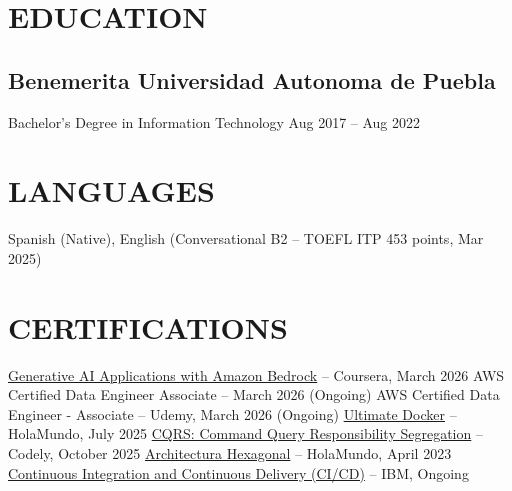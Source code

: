 \documentclass[a4paper,10pt]{article}
\begin{document}
\section*{EDUCATION}

\subsection*{\small Benemerita Universidad Autonoma de Puebla}
Bachelor's Degree in Information Technology \hfill Aug 2017 -- Aug 2022

\section*{LANGUAGES}
Spanish (Native), English (Conversational B2 -- TOEFL ITP 453 points, Mar 2025)

\section*{CERTIFICATIONS}
    \href{https://coursera.org/verify/HEG7YFDO6D1C}{Generative AI Applications with Amazon Bedrock} -- Coursera, March 2026
    AWS Certified Data Engineer Associate -- March 2026 (Ongoing)
    AWS Certified Data Engineer - Associate -- Udemy, March 2026 (Ongoing)
    \href{https://academia.holamundo.io/certificates/fifvbfywmp}{Ultimate Docker} -- HolaMundo, July 2025
    \href{https://www.linkedin.com/in/jose-carlos-huerta-garcia-773952212/details/certifications}{CQRS: Command Query Responsibility Segregation} -- Codely, October 2025
    \href{https://www.linkedin.com/in/jose-carlos-huerta-garcia-773952212/details/certifications/1758852008410/single-media-viewer/?profileId=ACoAADXjsscBqtjtdk4S_qpdkHwZs, Fn9y9TiG0o}{Architectura Hexagonal} -- HolaMundo, April 2023
    \href{https://www.coursera.org/programs/knu-high-o3k80/learn/continuous-integration-and-continuous-delivery-ci-cd?source=search}{Continuous Integration and Continuous Delivery (CI/CD)} -- IBM, Ongoing
\end{document}
